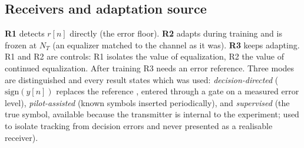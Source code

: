 \subsection{Receivers and adaptation source}
\label{sec:receivers}
\textbf{R1} detects $r[n]$ directly (the error floor). \textbf{R2} adapts during training and is frozen at $N_T$ (an equalizer matched to the channel as it was). \textbf{R3} keeps adapting. R1 and R2 are controls: R1 isolates the value of equalization, R2 the value of continued equalization. After training R3 needs an error reference. Three modes are distinguished and every result states which was used: \emph{decision-directed} ($\mathrm{sign}(y[n])$ replaces the reference \cite{sato1975,godard1980}, entered through a gate on a measured error level), \emph{pilot-assisted} (known symbols inserted periodically), and \emph{supervised} (the true symbol, available because the transmitter is internal to the experiment; used to isolate tracking from decision errors and never presented as a realisable receiver). 


